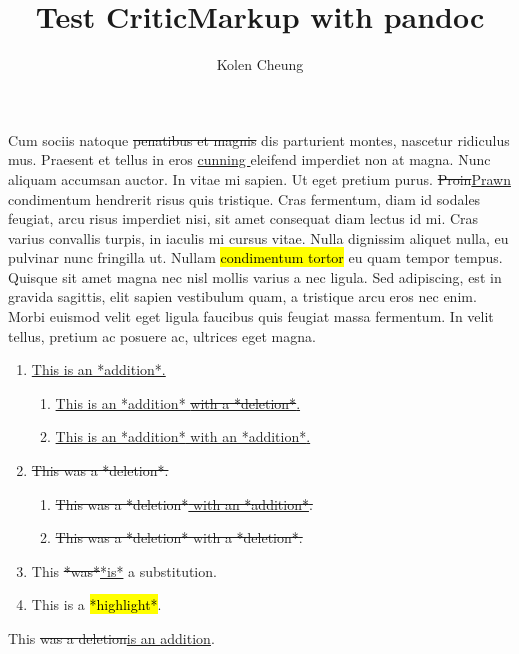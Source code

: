 \documentclass[]{article}
\title{Test CriticMarkup with pandoc}
\author{Kolen Cheung}
\date{}
\providecommand{\tightlist}{%
  \setlength{\itemsep}{0pt}\setlength{\parskip}{0pt}}
\begin{document}
\maketitle

Cum sociis natoque
\st{penatibus et magnis} dis
parturient montes, nascetur ridiculus mus. Praesent et tellus in eros
\underline{cunning }eleifend
imperdiet non at magna. Nunc aliquam accumsan auctor. In vitae mi
sapien. Ut eget pretium purus.
\st{Proin}\underline{Prawn}
condimentum hendrerit risus quis tristique. Cras fermentum, diam id
sodales feugiat, arcu risus imperdiet nisi, sit amet consequat diam
lectus id mi. Cras varius convallis turpis, in iaculis mi cursus vitae.
Nulla dignissim aliquet nulla, eu pulvinar nunc fringilla ut. Nullam
\hl{condimentum tortor} eu quam tempor tempus. Quisque
sit amet magna nec nisl mollis varius a nec ligula. Sed adipiscing, est
in gravida sagittis, elit sapien vestibulum quam, a
tristique arcu eros nec enim. Morbi euismod
velit eget ligula faucibus quis feugiat massa fermentum. In velit
tellus, pretium ac posuere ac, ultrices eget magna.

\begin{enumerate}
\def\labelenumi{\arabic{enumi}.}
\tightlist
\item
  \underline{This is an *addition*.}

  \begin{enumerate}
  \def\labelenumii{\arabic{enumii}.}
  \tightlist
  \item
    \underline{This is an *addition*\st{ with a *deletion*}.}
  \item
    \underline{This is an *addition*\underline{ with an *addition*}.}
  \end{enumerate}
\item
  \st{This was a *deletion*.}

  \begin{enumerate}
  \def\labelenumii{\arabic{enumii}.}
  \tightlist
  \item
    \st{This was a *deletion*\underline{ with an *addition*}.}
  \item
    \st{This was a *deletion*\st{ with a *deletion*}.}
  \end{enumerate}
\item
  This \st{*was*}\underline{*is*} a substitution.
\item
  This is a
  \hl{*highlight*}.
\end{enumerate}

This \st{was a \st{deletion}}\underline{is an \underline{addition}}.
\end{document}
